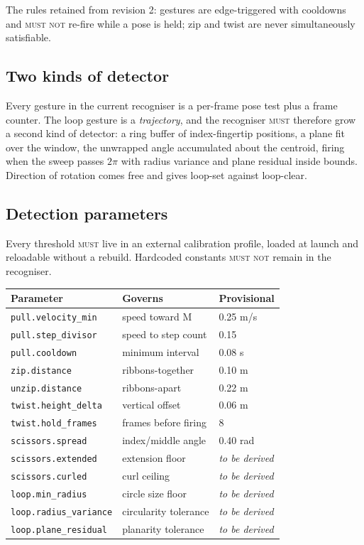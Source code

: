 \documentclass[11pt,a4paper]{article}
\newcommand{\MUST}{\textsc{must}}
\newcommand{\MUSTNOT}{\textsc{must not}}
\theoremstyle{definition}
\theoremstyle{plain}
\theoremstyle{remark}
\begin{document}
The rules retained from revision 2: gestures are edge-triggered with cooldowns and \MUSTNOT{}
re-fire while a pose is held; zip and twist are never simultaneously satisfiable.

\subsection{Two kinds of detector}

Every gesture in the current recogniser is a per-frame pose test plus a frame counter. The loop
gesture is a \emph{trajectory}, and the recogniser \MUST{} therefore grow a second kind of
detector: a ring buffer of index-fingertip positions, a plane fit over the window, the unwrapped
angle accumulated about the centroid, firing when the sweep passes $2\pi$ with radius variance and
plane residual inside bounds. Direction of rotation comes free and gives loop-set against
loop-clear.

\subsection{Detection parameters}

Every threshold \MUST{} live in an external calibration profile, loaded at launch and reloadable
without a rebuild. Hardcoded constants \MUSTNOT{} remain in the recogniser.

\begin{center}
\begin{tabular}{lll}
\toprule
\textbf{Parameter} & \textbf{Governs} & \textbf{Provisional} \\
\midrule
\texttt{pull.velocity\_min}    & speed toward M            & 0.25 m/s \\
\texttt{pull.step\_divisor}    & speed to step count       & 0.15 \\
\texttt{pull.cooldown}         & minimum interval          & 0.08 s \\
\texttt{zip.distance}          & ribbons-together          & 0.10 m \\
\texttt{unzip.distance}        & ribbons-apart             & 0.22 m \\
\texttt{twist.height\_delta}   & vertical offset           & 0.06 m \\
\texttt{twist.hold\_frames}    & frames before firing      & 8 \\
\texttt{scissors.spread}       & index/middle angle        & 0.40 rad \\
\texttt{scissors.extended}     & extension floor           & \emph{to be derived} \\
\texttt{scissors.curled}       & curl ceiling              & \emph{to be derived} \\
\texttt{loop.min\_radius}      & circle size floor         & \emph{to be derived} \\
\texttt{loop.radius\_variance} & circularity tolerance     & \emph{to be derived} \\
\texttt{loop.plane\_residual}  & planarity tolerance       & \emph{to be derived} \\
\bottomrule
\end{tabular}
\end{center}
\end{document}
